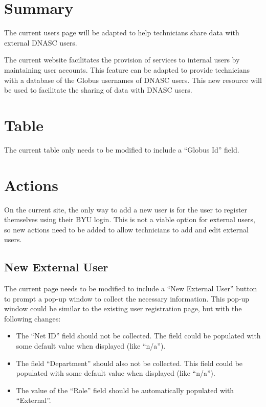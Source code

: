 \section{Summary}

The current users page will be adapted to help technicians share data with 
external DNASC users.

The current website facilitates the provision of services to internal users by
maintaining user accounts. This feature can be adapted to provide technicians
with a database of the Globus usernames of DNASC users. This new resource will 
be used to facilitate the sharing of data with DNASC users.

\section{Table}

The current table only needs to be modified to include a ``Globus Id'' field.

\section{Actions}

On the current site, the only way to add a new user is for the user to register
themselves using their BYU login. This is not a viable option for external users,
so new actions need to be added to allow technicians to add and edit external users.

\subsection{New External User}

The current page needs to be modified to include a ``New External User'' button to
prompt a pop-up window to collect the necessary information. This pop-up window
could be similar to the existing user registration page, but with the following
changes:
\begin{itemize}\itemsep1pt
    \item The ``Net ID'' field should not be collected. The field could be populated 
    with some default value when displayed (like ``n/a'').
    \item The field ``Department'' should also not be collected. This field could be
    populated with some default value when displayed (like ``n/a'').
    \item The value of the ``Role'' field should be automatically populated with 
    ``External''.
\end{itemize}

